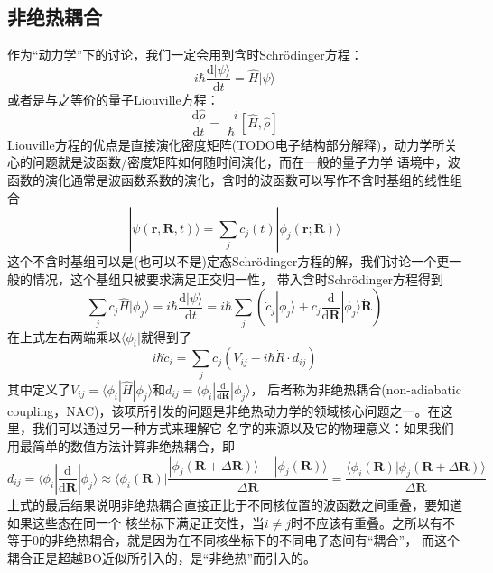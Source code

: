 \documentclass{article}
\numberwithin{equation}{section}
\begin{document}
      \subsection{非绝热耦合}
        作为“动力学”下的讨论，我们一定会用到含时Schr\"odinger方程：
        \begin{equation}
          i \hbar \frac{\mathrm{d} | \psi \rangle}{\mathrm{d} t}=\hat{H} | \psi \rangle
        \end{equation}
        或者是与之等价的量子Liouville方程：
        \begin{equation}
          \frac{\mathrm{d} \hat{\rho}}{\mathrm{d} t}=\frac{-i}{\hbar}[\hat{H}, \hat{\rho}]
        \end{equation}
        Liouville方程的优点是直接演化密度矩阵(TODO电子结构部分解释)，动力学所关心的问题就是波函数/密度矩阵如何随时间演化，而在一般的量子力学
        语境中，波函数的演化通常是波函数系数的演化，含时的波函数可以写作不含时基组的线性组合
        \begin{equation}
          |\psi(\mathbf{r}, \mathbf{R}, t)\rangle=\sum_{j} c_{j}(t) |\phi_{j}(\mathbf{r} ; \mathbf{R})\rangle
        \end{equation}
        这个不含时基组可以是(也可以不是)定态Schr\"odinger方程的解，我们讨论一个更一般的情况，这个基组只被要求满足正交归一性，
        带入含时Schr\"odinger方程得到
        \begin{equation}
          \sum_j c_j \hat{H}|\phi_j\rangle=i \hbar \frac{\mathrm{d} | \psi \rangle}{\mathrm{d} t}=i \hbar\sum_j\left(\dot{c}_j|\phi_j\rangle+c_j\frac{\mathrm{d}}{\mathrm{d}\mathbf{R}}|\phi_j\rangle\dot{\mathbf{R}}\right)
        \end{equation}
        在上式左右两端乘以$\langle\phi_i|$就得到了
        \begin{equation}
          i \hbar \dot{c}_{i}=\sum_{j} c_{j}\left(V_{i j}-i \hbar \dot{R} \cdot d_{i j}\right)
          \label{ihcdot}
        \end{equation}
        其中定义了$V_{ij}=\langle\phi_i|\hat{H}|\phi_j\rangle$和$d_{ij}=\langle\phi_i|\frac{\mathrm{d}}{\mathrm{d}\mathbf{R}}|\phi_j\rangle$，
        后者称为非绝热耦合(non-adiabatic coupling，NAC)，该项所引发的问题是非绝热动力学的领域核心问题之一。在这里，我们可以通过另一种方式来理解它
        名字的来源以及它的物理意义：如果我们用最简单的数值方法计算非绝热耦合，即
        \begin{equation}
          d_{ij}=\langle\phi_i|\frac{\mathrm{d}}{\mathrm{d}\mathbf{R}}|\phi_j\rangle\approx\langle\phi_i(\mathbf{R})|\frac{|\phi_j(\mathbf{R}+\Delta\mathbf{R})\rangle-|\phi_j(\mathbf{R})\rangle}{\Delta\mathbf{R}}
          =\frac{\langle\phi_i(\mathbf{R})|\phi_j(\mathbf{R}+\Delta\mathbf{R})\rangle}{\Delta\mathbf{R}}
        \end{equation}
        上式的最后结果说明非绝热耦合直接正比于不同核位置的波函数之间重叠，要知道如果这些态在同一个
        核坐标下满足正交性，当$i\neq j$时不应该有重叠。之所以有不等于0的非绝热耦合，就是因为在不同核坐标下的不同电子态间有“耦合”，
        而这个耦合正是超越BO近似所引入的，是“非绝热”而引入的。
        
\end{document}
